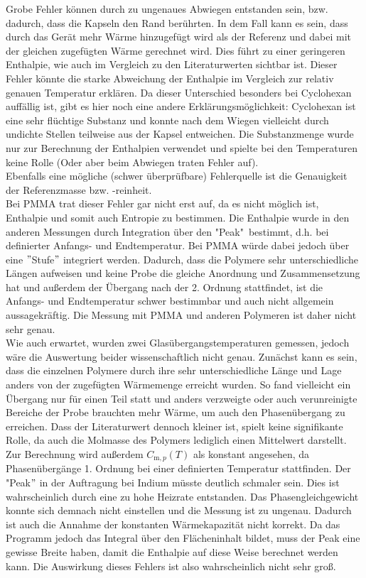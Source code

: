 \documentclass[12pt,a4paper,titlepage,headinclude,bibtotoc]{scrartcl}
\begin{document}
Grobe Fehler können durch zu ungenaues Abwiegen entstanden sein, bzw. dadurch, dass die Kapseln den Rand berührten. In dem Fall kann es sein, dass durch das Gerät mehr Wärme hinzugefügt wird als der Referenz und dabei mit der gleichen zugefügten Wärme gerechnet wird. Dies führt zu einer geringeren Enthalpie, wie auch im Vergleich zu den Literaturwerten sichtbar ist. Dieser Fehler könnte die starke Abweichung der Enthalpie im Vergleich zur relativ genauen Temperatur erklären. Da dieser Unterschied besonders bei Cyclohexan auffällig ist, gibt es hier noch eine andere Erklärungsmöglichkeit:
Cyclohexan ist eine sehr flüchtige Substanz und konnte nach dem Wiegen vielleicht durch undichte Stellen teilweise aus der Kapsel entweichen. Die Substanzmenge wurde nur zur Berechnung der Enthalpien verwendet und spielte bei den Temperaturen keine Rolle (Oder aber beim Abwiegen traten Fehler auf). \\
 Ebenfalls eine mögliche (schwer überprüfbare) Fehlerquelle ist die Genauigkeit der Referenzmasse bzw. -reinheit.\\

Bei PMMA trat dieser Fehler gar nicht erst auf, da es nicht möglich ist, Enthalpie und somit auch Entropie zu bestimmen. Die Enthalpie wurde in den anderen Messungen durch Integration über den "Peak"\, bestimmt, d.h. bei definierter Anfangs- und Endtemperatur. Bei PMMA würde dabei jedoch über eine $"$Stufe$"$ integriert werden. Dadurch, dass die Polymere sehr unterschiedliche Längen aufweisen und keine Probe die gleiche Anordnung und Zusammensetzung hat und außerdem der Übergang nach der 2. Ordnung stattfindet, ist die Anfangs- und Endtemperatur schwer bestimmbar und auch nicht allgemein aussagekräftig. Die Messung mit PMMA und anderen Polymeren ist daher nicht sehr genau. \\
Wie auch erwartet, wurden zwei Glasübergangstemperaturen gemessen, jedoch wäre die Auswertung beider wissenschaftlich nicht genau. Zunächst kann es sein, dass die einzelnen Polymere durch ihre sehr unterschiedliche Länge und Lage anders von der zugefügten Wärmemenge erreicht wurden. So fand vielleicht ein Übergang nur für einen Teil statt und anders verzweigte oder auch verunreinigte Bereiche der Probe brauchten mehr Wärme, um auch den Phasenübergang zu erreichen. Dass der Literaturwert dennoch kleiner ist, spielt keine signifikante Rolle, da auch die Molmasse des Polymers lediglich einen Mittelwert darstellt.\\ 

Zur Berechnung wird außerdem $C_{\mathrm{m},p}(T)$ als konstant angesehen, da Phasenübergänge 1. Ordnung bei einer definierten Temperatur stattfinden. Der "Peak$"$ in der Auftragung bei Indium müsste deutlich schmaler sein. Dies ist wahrscheinlich durch eine zu hohe Heizrate entstanden. Das Phasengleichgewicht konnte sich demnach nicht einstellen und die Messung ist zu ungenau. Dadurch ist auch die Annahme der konstanten Wärmekapazität nicht korrekt. Da das Programm jedoch das Integral über den Flächeninhalt bildet, muss der Peak eine gewisse Breite haben, damit die Enthalpie auf diese Weise berechnet werden kann. Die Auswirkung dieses Fehlers ist also wahrscheinlich nicht sehr groß.\\
\end{document}
